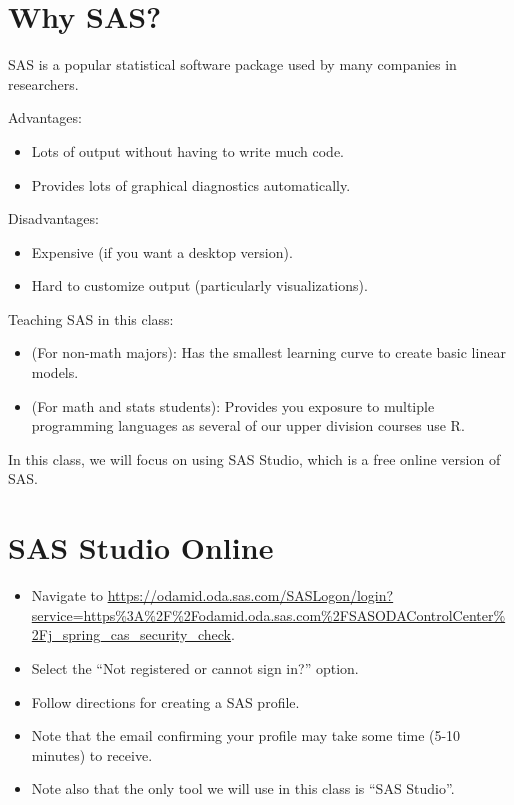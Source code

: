 \documentclass[12pt]{notes}
\begin{document}

\section{Why SAS?}

SAS is a popular statistical software package used by many companies in researchers. 

\nspace
Advantages:
\begin{itemize}
\item Lots of output without having to write much code. 
\item Provides lots of graphical diagnostics automatically. 
\end{itemize}

\nspace
Disadvantages: 
\begin{itemize}
\item Expensive (if you want a desktop version).
\item Hard to customize output (particularly visualizations). 
\end{itemize}

\nspace
Teaching SAS in this class:
\begin{itemize}
\item (For non-math majors): Has the smallest learning curve to create basic linear models. 
\item (For math and stats students): Provides you exposure to multiple programming languages as several of our upper division courses use R.
\end{itemize}

In this class, we will focus on using SAS Studio, which is a free online version of SAS. 

\section{SAS Studio Online}
\begin{itemize}
\item Navigate to \url{https://odamid.oda.sas.com/SASLogon/login?service=https%3A%2F%2Fodamid.oda.sas.com%2FSASODAControlCenter%2Fj_spring_cas_security_check}.
\item Select the ``Not registered or cannot sign in?'' option. 
\item Follow directions for creating a SAS profile. 
\item Note that the email confirming your profile may take some time (5-10 minutes) to receive.
\item Note also that the only tool we will use in this class is ``SAS Studio''.
\end{itemize}
\end{document}
